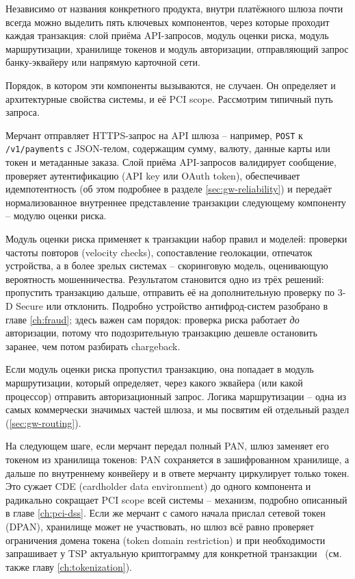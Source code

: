 Независимо от названия конкретного продукта, внутри платёжного
шлюза почти всегда можно выделить пять ключевых компонентов,
через которые проходит каждая транзакция: слой приёма API-запросов,
модуль оценки риска, модуль маршрутизации, хранилище токенов
и модуль авторизации, отправляющий запрос банку-эквайеру
или напрямую карточной сети.

Порядок, в котором эти компоненты вызываются, не случаен. Он
определяет и архитектурные свойства системы, и её PCI scope.
Рассмотрим типичный путь запроса.

Мерчант отправляет HTTPS-запрос на API шлюза -- например,
\texttt{POST} к \texttt{/v1/payments} с JSON-телом, содержащим
сумму, валюту, данные карты или токен и метаданные заказа.
Слой приёма API-запросов валидирует сообщение, проверяет
аутентификацию (API key или OAuth token), обеспечивает
идемпотентность (об этом подробнее в разделе \ref{sec:gw-reliability})
и передаёт нормализованное внутреннее представление транзакции
следующему компоненту -- модулю оценки риска.

Модуль оценки риска применяет к транзакции набор правил и моделей:
проверки частоты повторов (velocity checks), сопоставление
геолокации, отпечаток устройства, а в более зрелых системах --
скоринговую модель, оценивающую вероятность мошенничества.
Результатом становится одно из трёх решений: пропустить
транзакцию дальше, отправить её на дополнительную проверку
по 3-D Secure или отклонить. Подробно устройство антифрод-систем
разобрано в главе \ref{ch:fraud}; здесь важен сам порядок:
проверка риска работает \emph{до} авторизации, потому что
подозрительную транзакцию дешевле остановить заранее, чем потом
разбирать chargeback.

Если модуль оценки риска пропустил транзакцию, она попадает в модуль маршрутизации,
который определяет, через какого эквайера (или какой процессор)
отправить авторизационный запрос. Логика маршрутизации --
одна из самых коммерчески значимых частей шлюза, и мы посвятим
ей отдельный раздел (\ref{sec:gw-routing}).

На следующем шаге, если мерчант передал полный PAN, шлюз заменяет
его токеном из хранилища токенов: PAN сохраняется в зашифрованном
хранилище, а дальше по внутреннему конвейеру и в ответе мерчанту
циркулирует только токен. Это сужает CDE (cardholder data environment)
до одного компонента и радикально сокращает PCI scope всей
системы -- механизм, подробно описанный в главе
\ref{ch:pci-dss}. Если же мерчант с самого начала прислал
сетевой токен (DPAN), хранилище может не участвовать, но шлюз
всё равно проверяет ограничения домена токена (token domain
restriction) и при необходимости запрашивает у TSP актуальную
криптограмму для конкретной транзакции~\cite{emvco-payment-tokenisation-guide}
(см. также главу \ref{ch:tokenization}).

